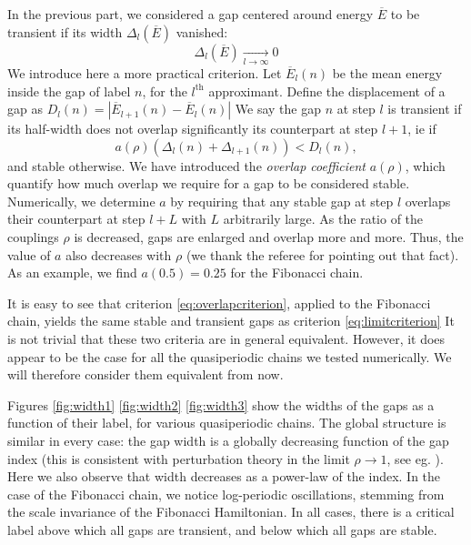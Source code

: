 \documentclass[a4paper]{jpconf}
\begin{document}
In the previous part, we considered a gap centered around energy $\overline{E}$ to be transient if its width $\Delta_l(\overline{E})$ vanished:
\begin{equation}
\label{eq:limitcriterion}
	\Delta_l(\overline{E}) \xrightarrow[l \to \infty]{} 0
\end{equation}
We introduce here a more practical criterion.
Let $\overline{E}_l(n)$ be the mean energy inside the gap of label $n$, for the $l^\text{th}$ approximant.
Define the displacement of a gap as $D_l(n) = |\overline{E}_{l+1}(n) - \overline{E}_l(n)| $
We say the gap $n$ at step $l$ is transient if its half-width does not overlap significantly its counterpart at step $l+1$, ie if 
\begin{equation}
\label{eq:overlapcriterion}
	a(\rho) ( \Delta_l(n) + \Delta_{l+1}(n) ) < D_l(n),
\end{equation}
and stable otherwise.
We have introduced the \emph{overlap coefficient} $a(\rho)$, which quantify how much overlap we require for a gap to be considered stable.
Numerically, we determine $a$ by requiring that any stable gap at step $l$ overlaps their counterpart at step $l+L$ with $L$ arbitrarily large.
As the ratio of the couplings $\rho$ is decreased, gaps are enlarged and overlap more and more.
Thus, the value of $a$ also decreases with $\rho$ (we thank the referee for pointing out that fact).
As an example, we find $a(0.5) = 0.25$ for the Fibonacci chain.

It is easy to see that criterion \eqref{eq:overlapcriterion}, applied to the Fibonacci chain, yields the same stable and transient gaps as criterion \eqref{eq:limitcriterion} 
It is not trivial that these two criteria are in general equivalent.
However, it does appear to be the case for all the quasiperiodic chains we tested numerically. 
We will therefore consider them equivalent from now.

Figures \eqref{fig:width1} \eqref{fig:width2} \eqref{fig:width3} show the widths of the gaps as a function of their label, for various quasiperiodic chains.
The global structure is similar in every case: the gap width is a globally decreasing function of the gap index (this is consistent with perturbation theory in the limit $\rho \to 1$, see eg. \cite{Luck}).
Here we also observe that width decreases as a power-law of the index.
In the case of the Fibonacci chain, we notice log-periodic oscillations, stemming from the scale invariance of the Fibonacci Hamiltonian.
In all cases, there is a critical label above which all gaps are transient, and below which all gaps are stable.
\end{document}
